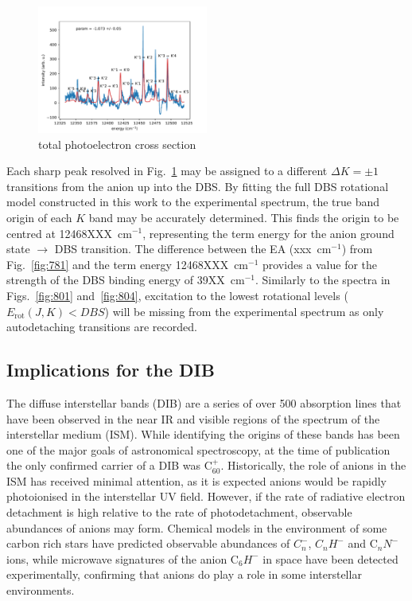 \documentclass[journal=jpcafh,manuscript=article,layout=onecolumn, 12pt]{achemso}
\begin{document}
\begin{figure}
	\includegraphics[width=0.5\textwidth]{scripts/scan}
	\caption{total photoelectron cross section}
	\label{fig:scan}
\end{figure}

Each sharp peak resolved in Fig.~\ref{fig:scan} may be assigned to a different $\Delta K=\pm1$ transitions from the anion up into the DBS. By fitting the full DBS rotational model constructed in this work to the experimental spectrum, the true band origin of each $K$ band may be accurately determined. This finds the origin to be centred at 12468XXX~cm$^{-1}$, representing the term energy for the anion ground state $\rightarrow$ DBS transition. The difference between the EA (xxx~cm$^{-1}$) from Fig.~\ref{fig:781} and the term energy 12468XXX~cm$^{-1}$ provides a value for the strength of the DBS binding energy of 39XX~cm$^{-1}$. Similarly to the spectra in Figs.~\ref{fig:801} and~\ref{fig:804}, excitation to the lowest rotational levels ($E_{\text{rot}}(J,K) < DBS$) will be missing from the experimental spectrum as only autodetaching transitions are recorded. 

\subsection{Implications for the DIB}
The diffuse interstellar bands (DIB) are a series of over 500 absorption lines that have been observed in the near IR and visible regions of the spectrum of the interstellar medium (ISM). While identifying the origins of these bands has been one of the major goals of astronomical spectroscopy, at the time of publication the only confirmed carrier of a DIB was C$_{60}^+$. Historically, the role of anions in the ISM has received minimal attention, as it is expected anions would be rapidly photoionised in the interstellar UV field. However, if the rate of radiative electron detachment is high relative to the rate of photodetachment, observable abundances of anions may form. Chemical models in the environment of some carbon rich stars have predicted observable abundances of $C_n^-$, $C_nH^-$ and C$_nN^-$ ions, while microwave signatures of the anion C$_6H^-$ in space have been detected experimentally, confirming that anions do play a role in some interstellar environments.
\end{document}
